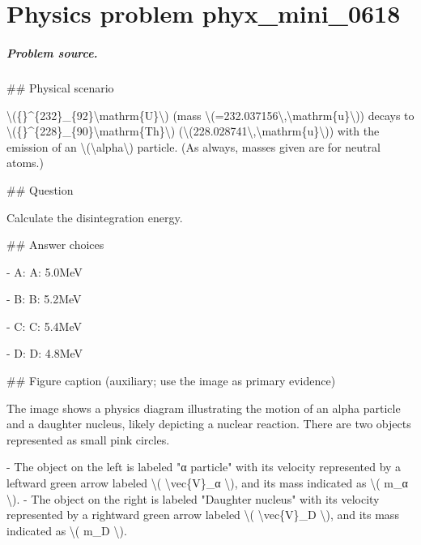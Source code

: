 
\chapter{Physics problem phyx\_mini\_0618}
\label{ch:PhyXMiniProblems_problem_phyx_mini_0618}

\paragraph{Problem source.}
\#\# Physical scenario

\textbackslash{}(\{\}\textasciicircum{}\{232\}\_\{92\}\textbackslash{}mathrm\{U\}\textbackslash{}) (mass \textbackslash{}(=232.037156\textbackslash{},\textbackslash{}mathrm\{u\}\textbackslash{})) decays to \textbackslash{}(\{\}\textasciicircum{}\{228\}\_\{90\}\textbackslash{}mathrm\{Th\}\textbackslash{}) (\textbackslash{}(228.028741\textbackslash{},\textbackslash{}mathrm\{u\}\textbackslash{})) with the emission of an \textbackslash{}(\textbackslash{}alpha\textbackslash{}) particle. (As always, masses given are for neutral atoms.)

\#\# Question

Calculate the disintegration energy.

\#\# Answer choices

- A: A: 5.0MeV

- B: B: 5.2MeV

- C: C: 5.4MeV

- D: D: 4.8MeV

\#\# Figure caption (auxiliary; use the image as primary evidence)

The image shows a physics diagram illustrating the motion of an alpha particle and a daughter nucleus, likely depicting a nuclear reaction. There are two objects represented as small pink circles. 

- The object on the left is labeled "α particle" with its velocity represented by a leftward green arrow labeled \textbackslash{}( \textbackslash{}vec\{V\}\_α \textbackslash{}), and its mass indicated as \textbackslash{}( m\_α \textbackslash{}).
- The object on the right is labeled "Daughter nucleus" with its velocity represented by a rightward green arrow labeled \textbackslash{}( \textbackslash{}vec\{V\}\_D \textbackslash{}), and its mass indicated as \textbackslash{}( m\_D \textbackslash{}).

